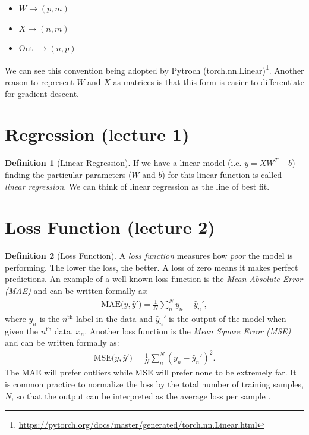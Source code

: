 \documentclass[11pt]{article}
\numberwithin{equation}{section}
\theoremstyle{definition}%
\newtheorem{definition}{Definition}[section]%
\begin{document}
\begin{itemize}
    \item {$W \rightarrow (p,m)$}
    \item {$X \rightarrow (n,m)$}
    \item {Out $\rightarrow (n,p)$}
\end{itemize}

We can see this convention being adopted by Pytroch (torch.nn.Linear)\footnote{\url{https://pytorch.org/docs/master/generated/torch.nn.Linear.html}}. Another reason to represent $W$ and $X$ as matrices is that this form is easier to differentiate for gradient descent.

\section{Regression (lecture 1)}
\begin{definition}[Linear Regression]

If we have a linear model (i.e. $y=XW^T+b$) finding the particular parameters ($W$ and $b$) for this linear function is called \emph{linear regression}. We can think of linear regression as the line of best fit. 
\end{definition}

\section{Loss Function (lecture 2)}

\begin{definition}[Loss Function]
A \emph{loss function} measures how \emph{poor} the model is performing. The lower the loss, the better. A loss of zero means it makes perfect predictions. An example of a well-known loss function is the \emph{Mean Absolute Error (MAE)} and can be written formally as:
\begin{align}
    \text{MAE($y, \hat{y}'$)} = \frac{1}{N}\sum_{n}^{N}{y_n - \hat{y}_n'},
\end{align}
where $y_n$ is the $n^{\text{th}}$ label in the data and $\hat{y}_n'$ is the output of the model when given the $n^{\text{th}}$ data, $x_n$. Another loss function is the \emph{Mean Square Error (MSE)} and can be written formally as:
\begin{align}
    \text{MSE($y, \hat{y}'$)} = \frac{1}{N}\sum_{n}^{N}{(y_n - \hat{y}_n')^2}.
\end{align}
The MAE will prefer outliers while MSE will prefer none to be extremely far. It is common practice to normalize the loss by the total number of training samples, $N$, so that the output can be interpreted as the average loss per sample \cite{Cornell}.

\end{definition}
\end{document}
